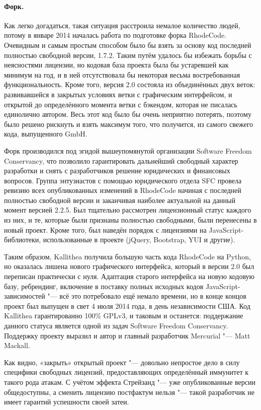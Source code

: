 \documentclass[10pt, a5paper]{article}
\begin{document}
\paragraph{Форк.}

Как легко догадаться, такая ситуация расстроила немалое количество людей, потому в январе 2014 началась работа по подготовке форка RhodeCode. Очевидным и самым простым способом было бы взять за основу код последней полностью свободной версии, 1.7.2. Таким путём удалось бы избежать борьбы с неясностями лицензии, но кодовая база проекта была бы устаревшей как минимум на год, и в ней отсутствовала бы некоторая весьма востребованная функциональность. Кроме того, версия 2.0 состояла из объединённых двух веток: развивавшейся в закрытых условиях ветки с графическим интерфейсом, и открытой до определённого момента ветки с бэкендом, которая не писалась единолично автором. Весь этот код было бы очень неприятно потерять, поэтому было решено рискнуть и взять максимум того, что получится, из самого свежего кода, выпущенного GmbH.

Форк производился под эгидой вышеупомянутой организации Software Freedom Conservancy, что позволило гарантировать дальнейший свободный характер разработки и снять с разработчиков решение юридических и финансовых вопросов. Группа энтузиастов с помощью юридического отдела SFC провела ревизию всех опубликованных изменений в RhodeCode начиная с последней полностью свободной версии и заканчивая наиболее актуальной на данный момент версией 2.2.5. Был тщательно рассмотрен лицензионный статус каждого из них, и те, которые были признаны полностью свободными, были перенесены в новый проект. Кроме того, был наведён порядок с лицензиями на JavaScript-библиотеки, использованные в проекте (jQuery, Bootstrap, YUI и другие).

Таким образом, Kallithea получила большую часть кода \linebreak RhodeCode на Python, но оказалась лишена нового графического интерфейса, который в версии 2.0 был переписан практически с нуля. Адаптация старого интерфейса на новую кодовую базу, ребрендинг, включение в поставку полных исходных кодов JavaScript-зависимостей "--- всё это потребовало ещё немало времени, но в конце концов проект был выпущен в свет 4 июля 2014 года, в день независимости США. Код Kallithea гарантированно 100\% GPLv3, и таковым и останется: поддержание данного статуса является одной из задач Software Freedom Conservancy. Поддержку проекту выразил и автор и главный разработчик Mercurial "--- Matt Mackall.

Как видно, «закрыть» открытый проект "--- довольно непростое дело в силу специфики свободных лицензий, предоставляющих \linebreak определённый иммунитет к такого рода атакам. С учётом эффекта Стрейзанд "--- уже опубликованные версии общедоступны, а сменить лицензию постфактум нельзя "--- такой разработчик не имеет гарантий успешности своей затеи.
\end{document}
